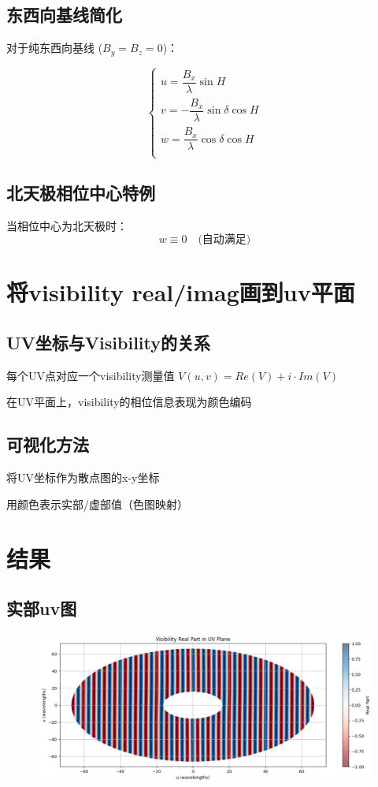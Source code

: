 \documentclass{article}
\begin{document}
\subsection{东西向基线简化}
对于纯东西向基线 ($B_y = B_z = 0$)：

\begin{equation}
\begin{cases}
u = \dfrac{B_x}{\lambda} \sin H \\
v = -\dfrac{B_x}{\lambda} \sin \delta \cos H \\
w = \dfrac{B_x}{\lambda} \cos \delta \cos H \\
\end{cases}
\end{equation}

\subsection{北天极相位中心特例}
当相位中心为北天极时：
\begin{equation}
w \equiv 0 \quad \text{(自动满足)}
\end{equation}

\section{将visibility real/imag画到uv平面}
\subsection{UV坐标与Visibility的关系}
每个UV点对应一个visibility测量值 $V(u,v)=Re(V)+i \cdot Im(V)$

在UV平面上，visibility的相位信息表现为颜色编码
\subsection{可视化方法}
将UV坐标作为散点图的x-y坐标

用颜色表示实部/虚部值（色图映射）

\section{结果}
\subsection{实部uv图}
    \begin{figure}[htp]
    \centering
    \includegraphics[width=1\textwidth]{fig/real.png}
    \label{fig:real}
    \end{figure}
\end{document}
